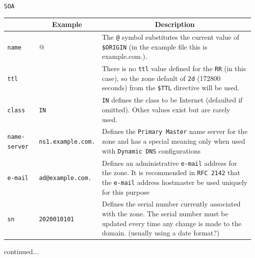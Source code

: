 \documentclass[xcolor=table]{beamer}
\begin{document}
\begin{frame}{\texttt{SOA}}
  \begin{table}
    \tiny
    \begin{tabular}{|p{1.6cm}|p{1.6cm}|p{4.7cm}|} 
      \hline
      \rowcolor{gray}
      \multicolumn{1}{|c|}{Syntax} & \multicolumn{1}{c|}{Example} & \multicolumn{1}{c|}{Description}\\ 
      \hline
      \texttt{name}&@&The \texttt{@} symbol substitutes the current value of \texttt{\$ORIGIN} (in the example file this is example.com.).\\
      \hline
      \texttt{ttl}&&There is no \texttt{ttl} value defined for the \texttt{RR} (in this case), so the zone default of \texttt{2d} (172800 seconds) from the \texttt{\$TTL} directive will be used.\\
      \hline
      \texttt{class}&\texttt{IN}&\texttt{IN} defines the class to be Internet (defaulted if omitted). Other values exist but are rarely used.\\
      \hline
      \texttt{name-server}&\texttt{ns1.example.com.}&Defines the \texttt{Primary Master} name server for the zone and has a special meaning only when used with \texttt{Dynamic DNS} configurations\\
      \hline
      \texttt{e-mail}&\texttt{ad@example.com.}&Defines an administrative \texttt{e-mail} address for the zone. It is recommended in \texttt{RFC 2142} that the \texttt{e-mail} address hostmaster be used uniquely for this purpose\\
      \hline
      \texttt{sn}&\texttt{2020010101}&Defines the serial number currently associated with the zone. The serial number must be updated every time any change is made to the domain. (usually using a date format?)\\
      \hline
    \end{tabular}
  \end{table}
  continued...
\end{frame}
\end{document}
